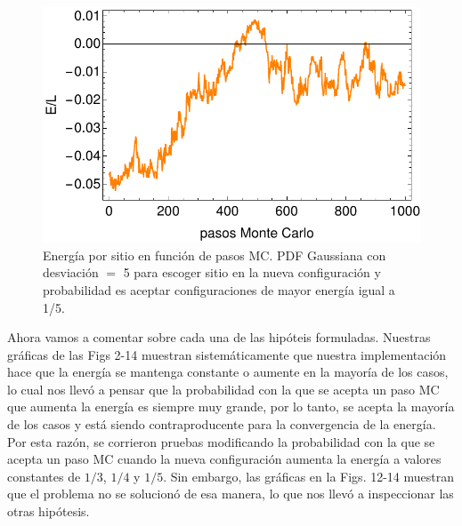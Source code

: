 \documentclass[letterpaper,superscriptaddress,aps,pra,nolongbibliography,twocolumn,showpacs,floatfix,10pt]{revtex4-2} %
\renewcommand{\>}{\rangle}
\newcommand{\<}{\langle}
\newcommand{\shk}{Sherrington-Kirkpatrick}
\begin{document}
\begin{figure}
\centering
\includegraphics[width=0.9\columnwidth]{intento_014}
\caption{Energía por sitio en función de pasos MC. PDF Gaussiana
con desviación $=$ 5 para escoger sitio en la nueva configuración
y probabilidad es aceptar configuraciones de mayor energía igual a 1/5.}
\end{figure}

%

Ahora vamos a comentar sobre cada una de las hipóteis formuladas. Nuestras
gráficas de las Figs 2-14 muestran sistemáticamente que nuestra implementación
hace que la energía se mantenga constante o aumente en la mayoría de los casos,
lo cual nos llevó a pensar que la probabilidad con la que se acepta 
un paso MC que aumenta la energía es siempre muy grande, por lo tanto,
se acepta la mayoría de los casos y está siendo contraproducente para 
la convergencia de la energía. Por esta razón, se corrieron pruebas
modificando la probabilidad con la que se acepta un paso MC cuando la 
nueva configuración aumenta la energía a valores constantes de $1/3$, $1/4$
y $1/5$. Sin embargo, las gráficas en la Figs. 12-14 muestran que 
el problema no se solucionó de esa manera, lo que nos llevó a inspeccionar
las otras hipótesis.
\end{document}
